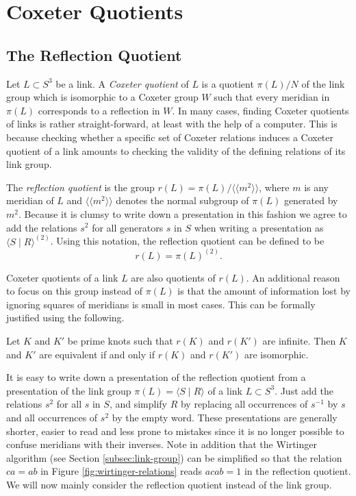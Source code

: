 \documentclass[main.tex]{subfiles}
\begin{document}
\section{Coxeter Quotients} \label{sec:coxeter-quotients}
\subsection{The Reflection Quotient}\label{subsec:reflection-quotient}
Let $L \subset S^3$ be a link. A \textit{Coxeter quotient} of $L$ is a quotient $\pi(L)/N$ of the link group which is isomorphic to a Coxeter group $W$ such that every meridian in $\pi(L)$ corresponds to a reflection in $W$.
In many cases, finding Coxeter quotients of links is rather straight-forward, at least with the help of a computer. This is because checking whether a specific set of Coxeter relations induces a Coxeter quotient of a link amounts to checking the validity of the defining relations of its link group.

The \textit{reflection quotient} is the group $r(L) = \pi(L) / \langle \langle m^2 \rangle \rangle$, where $m$ is any meridian of $L$ and $\langle \langle m^2 \rangle \rangle$ denotes the normal subgroup of $\pi(L)$ generated by $m^2$. Because it is clumsy to write down a presentation in this fashion we agree to add the relations $s^2$ for all generators $s$ in $S$ when writing a presentation as $\langle S \; | \; R \rangle^{(2)}$. Using this notation, the reflection quotient can be defined to be
$$r(L) = \pi(L)^{(2)}.$$

Coxeter quotients of a link $L$ are also quotients of $r(L)$. An additional reason to focus on this group instead of $\pi(L)$ is that the amount of information lost by ignoring squares of meridians is small in most cases. This can be formally justified using the following.

\begin{theorem}
Let $K$ and $K'$ be prime knots such that $r(K)$ and $r(K')$ are infinite. Then $K$ and $K'$ are equivalent if and only if $r(K)$ and $r(K')$ are isomorphic.
\end{theorem}


It is easy to write down a presentation of the reflection quotient from a presentation of the link group $\pi(L) = \langle S \; | \; R \rangle$ of a link $L \subset S^3$. Just add the relations $s^2$ for all $s$ in $S$, and simplify $R$ by replacing all occurrences of $s^{-1}$ by $s$ and all occurrences of $s^2$ by the empty word. These presentations are generally shorter, easier to read and less prone to mistakes since it is no longer possible to confuse meridians with their inverses.
Note in addition that the Wirtinger algorithm (see Section \ref{subsec:link-group}) can be simplified so that the relation $ca = ab$ in Figure \ref{fig:wirtinger-relations} reads $acab = 1$ in the reflection quotient.
We will now mainly consider the reflection quotient instead of the link group.
\end{document}
